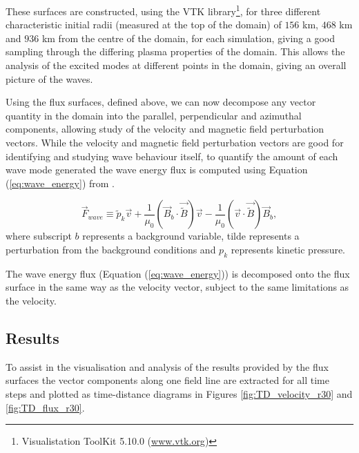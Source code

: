 These surfaces are constructed, using the VTK library\footnote{Visualistation ToolKit 5.10.0 (\url{www.vtk.org})}, for three different characteristic initial radii (measured at the top of the domain) of $156$ km, $468$ km and $936$ km from the centre of the domain, for each simulation, giving a good sampling through the differing plasma properties of the domain.
This allows the analysis of the excited modes at different points in the domain, giving an overall picture of the waves.

Using the flux surfaces, defined above, we can now decompose any vector quantity in the domain into the parallel, perpendicular and azimuthal components, allowing study of the velocity and magnetic field perturbation vectors.
While the velocity and magnetic field perturbation vectors are good for identifying and studying wave behaviour itself, to quantify the amount of each wave mode generated the wave energy flux is computed using Equation (\ref{eq:wave_energy}) from \cite{bogdan2003}.

\begin{equation}
\vec{F}_{wave} \equiv \widetilde{p}_k \vec{v} + \frac{1}{\mu_0} \left(\vec{B}_b \cdot \vec{\widetilde{B}}\right) \vec{v} - \frac{1}{\mu_0}\left(\vec{v} \cdot \vec{\widetilde{B}} \right) \vec{B}_b,
\label{eq:wave_energy}
\end{equation}
where subscript $b$ represents a background variable, tilde represents a perturbation from the background conditions and $p_k$ represents kinetic pressure.

The wave energy flux (Equation (\ref{eq:wave_energy})) is decomposed onto the flux surface in the same way as the velocity vector, subject to the same limitations as the velocity.

\subsection{Results}\label{subsec:results}

To assist in the visualisation and analysis of the results provided by the flux surfaces the vector components along one field line are extracted for all time steps and plotted as time-distance diagrams in Figures \ref{fig:TD_velocity_r30} and \ref{fig:TD_flux_r30}.

